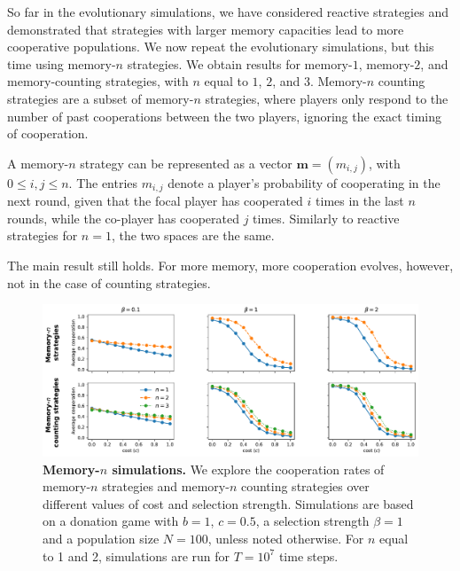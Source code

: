 \documentclass[11pt]{article}
\theoremstyle{plainCl1}
\theoremstyle{plainCl2}
\begin{document}
So far in the evolutionary simulations, we have considered reactive strategies
and demonstrated that strategies with larger memory capacities lead to more
cooperative populations. We now repeat the evolutionary simulations, but this
time using memory-$n$ strategies. We obtain results for memory-$1$, memory-$2$,
and memory-counting strategies, with $n$ equal to $1$, $2$, and $3$. Memory-$n$
counting strategies are a subset of memory-$n$ strategies, where players only
respond to the number of past cooperations between the two players, ignoring the
exact timing of cooperation.

A memory-$n$ strategy can be represented as a vector $\mathbf{m} = (m_{i,j})$,
with $0 \leq i, j \leq n$. The entries $m_{i,j}$ denote a player's probability
of cooperating in the next round, given that the focal player has cooperated $i$
times in the last $n$ rounds, while the co-player has cooperated $j$ times.
Similarly to reactive strategies for \(n = 1\), the two spaces are the same.

The main result still holds. For more memory, more cooperation evolves, however,
not in the case of counting strategies.


\begin{figure}[h]
  \centering
  \includegraphics[width=.75\textwidth]{../../figures/siFigMemorySim.pdf}
  \caption{
  \textbf{Memory-$n$ simulations.}
  We explore the cooperation rates of memory-$n$ strategies and memory-$n$
  counting strategies over different values of cost and selection strength.
  Simulations are based on a donation game with \(b\!=\!1\),  \(c\!=\!0.5\), a
  selection strength $\beta\!=\!1$ and a population size $N\!=\!100$, unless
  noted otherwise. For $n$ equal to 1 and 2, simulations are run for \(T\!=\! 10
  ^ 7\) time steps.
  }
\end{figure}
\end{document}
